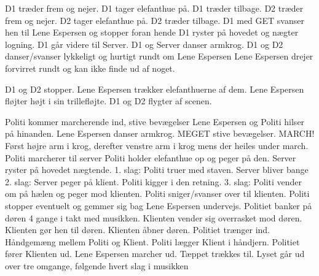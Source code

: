 \documentclass[a4paper,11pt]{article}
\begin{document}
\begin{sketch}

 D1 træder frem og nejer.
		D1 tager elefanthue på.
		D1 træder tilbage.
 D2 træder frem og nejer.
		D2 tager elefanthue på.
		D2 træder tilbage.
 D1 med GET svanser hen til Lene Espersen og stopper foran hende
 D1 ryster på hovedet og nægter logning.
		D1 går videre til Server.
 D1 og Server danser armkrog.
 D1 og D2 danser/svanser lykkeligt og hurtigt rundt om Lene Espersen
		Lene Espersen drejer forvirret rundt og kan ikke finde ud af noget.


 D1 og D2 stopper.
		Lene Espersen trækker elefanthuerne af dem.
		Lene Espersen fløjter højt i sin trillefløjte.
		D1 og D2 flygter af scenen.
		

 Politi kommer marcherende ind, stive bevægelser
 Lene Espersen og Politi hilser på hinanden.
 Lene Espersen danser armkrog. MEGET stive bevægelser. MARCH!
		Først højre arm i krog, derefter venstre arm i krog mens der heiles under march.
 Politi marcherer til server
 Politi holder elefanthue op og peger på den.
		Server ryster på hovedet nægtende.
		1. slag: Politi truer med staven. Server bliver bange
		2. slag: Server peger på klient. Politi kigger i den retning.
		3. slag: Politi vender om på hælen og peger mod klienten.
 Politi sniger/svanser over til klienten.
		Politi stopper eventuelt og gemmer sig bag Lene Espersen undervejs.
 Politiet banker på døren 4 gange i takt med musikken.
 Klienten vender sig overrasket mod døren.
		Klienten gør hen til døren.
		Klienten åbner døren.
 Politiet trænger ind.
		Håndgemæng mellem Politi og Klient.
		Politi lægger Klient i håndjern.
 Politiet fører Klienten ud.
 Lene Espersen marcher ud.
 Tæppet trækkes til.
 Lyset går ud over tre omgange, følgende hvert slag i musikken


\end{sketch}
\end{document}

